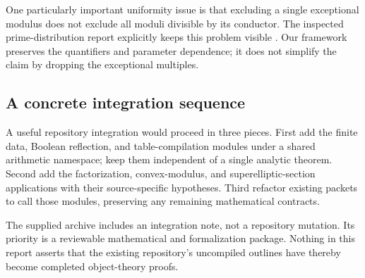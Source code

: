 One particularly important uniformity issue is that excluding a single
exceptional modulus does not exclude all moduli divisible by its
conductor. The inspected prime-distribution report explicitly keeps this
problem visible \cite{repo-prime-sw}. Our framework preserves the
quantifiers and parameter dependence; it does not simplify the claim by
dropping the exceptional multiples.

\subsection{A concrete integration sequence}

A useful repository integration would proceed in three pieces. First
add the finite data, Boolean reflection, and table-compilation modules
under a shared arithmetic namespace; keep them independent of a single
analytic theorem. Second add the factorization, convex-modulus, and
superelliptic-section applications with their source-specific hypotheses.
Third refactor existing packets to call those modules, preserving any
remaining mathematical contracts.

The supplied archive includes an integration note, not a repository
mutation. Its priority is a reviewable mathematical and formalization
package. Nothing in this report asserts that the existing repository's
uncompiled outlines have thereby become completed object-theory proofs.

